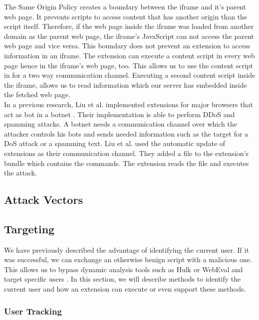 		The Same Origin Policy creates a boundary between the iframe and it's parent web page. It prevents scripts to access content that has another origin than the script itself. Therefore, if the web page inside the iframe was loaded from another domain as the parent web page, the iframe's JavaScript can not access the parent web page and vice versa. This boundary does not prevent an extension to access information in an iframe. The extension can execute a content script in every web page hence in the iframe's web page, too. This allows us to use the content script in  for a two way communication channel. Executing a second content script inside the iframe, allows us to read information which our server has embedded inside the fetched web page. \\
		
		In a previous research, Liu et al. implemented extensions for major browsers that act as bot in a botnet \cite{liu2011botnet}. Their implementation is able to perform DDoS and spamming attacks. A botnet needs a communication channel over which the attacker controls his bots and sends needed information such as the target for a DoS attack or a spamming text. Liu et al. used the automatic update of extensions as their communication channel. They added a file to the extension's bundle which contains the commands. The extension reads the file and executes the attack.  
	
	\subsection{Attack Vectors}
		
		
		
	\subsection{Targeting}
	
		We have previously described the advantage of identifying the current user. If it was successful, we can exchange an otherwise benign script with a malicious one. This allows us to bypass dynamic analysis tools such as Hulk or WebEval and target specific users \cite{184485, 190984}. In this section, we will describe methods to identify the current user and how an extension can execute or even support these methods. 
		
		\subsubsection{User Tracking}
	
